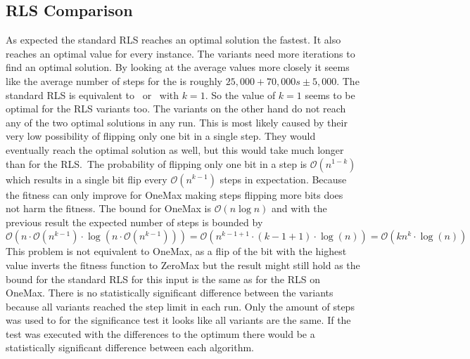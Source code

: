 \subsection{RLS Comparison}

As expected the standard RLS reaches an optimal solution the fastest.
It also reaches an optimal value for every instance.
The \RLSR[s] variants need more iterations to find an optimal solution.
By looking at the average values more closely it seems like the average number of steps for the \RLSR[s] is roughly $25,000 + 70,000s \pm 5,000$.
The standard RLS is equivalent to \RLSR~or \RLSN~with $k=1$.
So the value of $k=1$ seems to be optimal for the RLS variants too.
The \RLSN[b] variants on the other hand do not reach any of the two optimal solutions in any run.
This is most likely caused by their very low possibility of flipping only one bit in a single step.
They would eventually reach the optimal solution as well, but this would take much longer than for the RLS.\
The probability of flipping only one bit in a step is $\mathcal{O}(n^{1-k})$ which results in a single bit flip every $\mathcal{O}(n^{k-1})$ steps in expectation.
Because the fitness can only improve for OneMax making steps flipping more bits does not harm the fitness.
The bound for OneMax is $\mathcal{O}(n\log n)$ and with the previous result the expected number of steps is bounded by
$\mathcal{O}(n\cdot\mathcal{O}(n^{k-1})\cdot \log(n\cdot\mathcal{O}(n^{k-1}))) 
=\mathcal{O}(n^{k-1+1}\cdot (k-1+1)\cdot\log(n))
=\mathcal{O}(kn^{k}\cdot\log(n))$
This problem is not equivalent to OneMax, as a flip of the bit with the highest value inverts the fitness function to ZeroMax but the result might still hold as the bound for the standard RLS for this input is the same as for the RLS on OneMax.
There is no statistically significant difference between the \RLSN[b] variants because all variants reached the step limit in each run.
Only the amount of steps was used to for the significance test it looks like all variants are the same.
If the test was executed with the differences to the optimum there would be a statistically significant difference between each algorithm.
